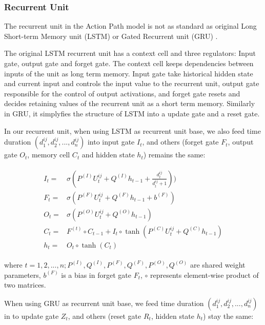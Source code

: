 \subsubsection{Recurrent Unit}
\label{sec:recurrent-unit}

The recurrent unit in the Action Path model is not as standard as original 
Long Short-term Memory unit (LSTM)
\cite{hochreiter1997lstm} or 
Gated Recurrent unit (GRU) \cite{DBLP:journals/corr/ChoMGBSB14}.

The original LSTM recurrent unit has a context cell and three regulators: Input gate, 
output gate and forget gate.
The context cell keeps dependencies between inputs of the unit as long term memory. 
Input gate take historical hidden state and current input and controls the input value to
the recurrent unit, output gate responsible for the control of output activations, and
forget gate resets and decides retaining values of the recurrent unit as a short term memory.
Similarly in GRU, it simplyfies the structure of LSTM into a update gate and a reset gate.

In our recurrent unit, when using LSTM as recurrent unit base, we also 
feed time duration $(d^{ij}_1, d^{ij}_2, ..., d^{ij}_n)$
into input gate $I_t$, and others (forget gate $F_t$, output gate $O_t$, 
memory cell $C_t$ and hidden state $h_t$) remains the same:

\begin{align}
\label{eqn:lstm}
\begin{split}
    I_t =& \sigma ( P^{(I)} U^{ij}_t + Q^{(I)} h_{t-1} + \frac{d^{ij}_t}{d^{ij}_t + 1}) ) \\
    F_t =& \sigma ( P^{(F)} U^{ij}_t + Q^{(F)} h_{t-1} + b^{(F)}) \\
    O_t =& \sigma ( P^{(O)} U^{ij}_t + Q^{(O)} h_{t-1} ) \\
    C_t =& F^{(t)} \circ C_{t-1} + I_t \circ \tanh (P^{(C)} U^{ij}_t + Q^{(C)} h_{t-1}) \\
    h_t =& O_t \circ \tanh (C_t)
\end{split}
\end{align}

where $t = 1, 2, ..., n; P^{(I)}, Q^{(I)}, P^{(F)}, Q^{(F)}, P^{(O)}, Q^{(O)}$ are shared weight parameters, 
$b^{(F)}$ is a bias in forget gate $F_t$,
$\circ$ represents element-wise product of two matrices.

When using GRU as recurrent unit base, we feed time duration $(d^{ij}_1, d^{ij}_2, ..., d^{ij}_n)$
in to update gate $Z_t$, and others (reset gate $R_t$, hidden state $h_t$) stay the same:


